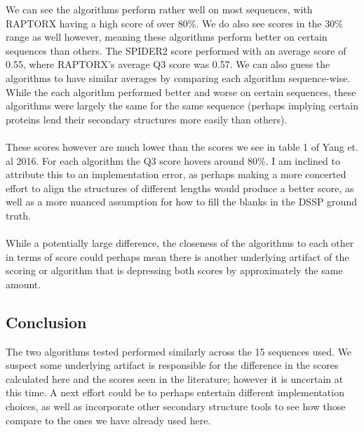 \documentclass[12pt, oneside]{article}
\begin{document}
We can see the algorithms perform rather well on most sequences, with RAPTORX having a high score of over 80\%. We do also see scores in the 30\% range as well however, meaning these algorithms perform better on certain sequences than others. The SPIDER2 score performed with an average score of 0.55, where RAPTORX's average Q3 score was 0.57. We can also guess the algorithms to have similar averages by comparing each algorithm sequence-wise. While the each algorithm performed better and worse on certain sequences, these algorithms were largely the same for the same sequence (perhaps implying certain proteins lend their secondary structures more easily than others). \\ \\
These scores however are much lower than the scores we see in table 1 of Yang et. al 2016. For each algorithm the Q3 score hovers around 80\%. I am inclined to attribute this to an implementation error, as perhaps making a more concerted effort to align the structures of different lengths would produce a better score, as well as a more nuanced assumption for how to fill the blanks in the DSSP ground truth. \\ \\
While a potentially large difference, the closeness of the algorithms to each other in terms of score could perhaps mean there is another underlying artifact of the scoring or algorithm that is depressing both scores by approximately the same amount.

\subsection*{Conclusion}
The two algorithms tested performed similarly across the 15 sequences used. We suspect some underlying artifact is responsible for the difference in the scores calculated here and the scores seen in the literature; however it is uncertain at this time. A next effort could be to perhaps entertain different implementation choices, as well as incorporate other secondary structure tools to see how those compare to the ones we have already used here.
\end{document}
